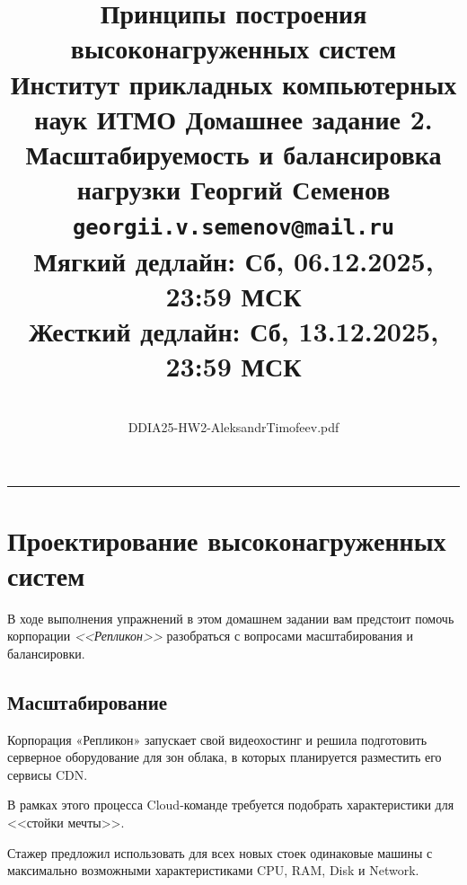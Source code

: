 \documentclass[12pt]{article}
\begin{document}
 
\title{
    \large Принципы построения высоконагруженных систем \\
    \normalsize Институт прикладных компьютерных наук ИТМО
    \bigbreak 
    \LARGE
    Домашнее задание 2. \\ Масштабируемость и балансировка нагрузки
    \bigbreak \normalsize
    Георгий Семенов \\
    \texttt{georgii.v.semenov@mail.ru} \\
    Мягкий дедлайн: Сб, 06.12.2025, 23:59 МСК \\
    Жесткий дедлайн: Сб, 13.12.2025, 23:59 МСК
}
\author{
    \color{red}{Александр Тимофеев} \\
    \normalsize
    DDIA25-HW2-{\color{red}AleksandrTimofeev}.pdf
}

\maketitle

\noindent\rule{\textwidth}{1pt} \bigbreak

\break

\section{Проектирование высоконагруженных систем}{}

\begin{flushleft}
	В ходе выполнения упражнений в этом домашнем задании вам предстоит помочь корпорации \textit{<<Репликон>>}
	разобраться с вопросами масштабирования и балансировки.
\end{flushleft}

\subsection{Масштабирование}

\begin{flushleft}
Корпорация «Репликон» запускает свой видеохостинг и решила подготовить
серверное оборудование для зон облака, в которых планируется разместить его сервисы CDN.

В рамках этого процесса Cloud-команде требуется подобрать характеристики для <<стойки мечты>>.
\end{flushleft}

\begin{flushleft}
Стажер предложил использовать для всех новых стоек
одинаковые машины с максимально возможными характеристиками CPU, RAM, Disk и Network.
\end{flushleft}
\end{document}
